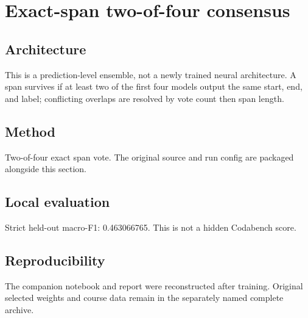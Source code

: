 \section{Exact-span two-of-four consensus}
\subsection{Architecture}
This is a prediction-level ensemble, not a newly trained neural architecture. A span survives if at least two of the first four models output the same start, end, and label; conflicting overlaps are resolved by vote count then span length.
\subsection{Method}
Two-of-four exact span vote. The original source and run config are packaged alongside this section.
\subsection{Local evaluation}
Strict held-out macro-F1: 0.463066765. This is not a hidden Codabench score.
\subsection{Reproducibility}
The companion notebook and report were reconstructed after training. Original selected weights and course data remain in the separately named complete archive.
